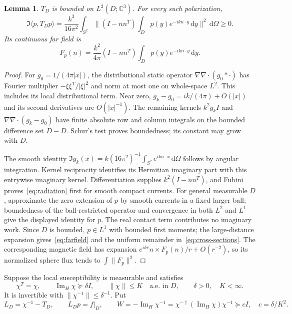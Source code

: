\documentclass[11pt,a4paper]{article}
\newtheorem{lemma}[theorem]{Lemma}
\theoremstyle{remark}
\newcommand{\norm}[1]{\lVert #1\rVert}
\newcommand{\abs}[1]{\lvert #1\rvert}
\newcommand{\ip}[2]{\langle #1,#2\rangle}
\newcommand{\dd}{\,\mathrm d}
\newcommand{\ImH}{\operatorname{Im}_{H}}
\begin{document}
\begin{lemma}\label{lem:Green}
$T_D$ is bounded on $L^2(D;\mathbb C^3)$. For every such polarization,
\begin{equation}\label{eq:radiation}
 \Im\ip p{T_Dp}=\frac{k^3}{16\pi^2}\int_{S^2}
 \norm{(I-nn^T)\int_Dp(y)e^{-ikn\cdot y}\dd y}^2\dd\Omega\geq0.
\end{equation}
Its continuous far field is
\begin{equation}\label{eq:farfield}
 F_p(n)=\frac{k^2}{4\pi}(I-nn^T)\int_Dp(y)e^{-ikn\cdot y}\dd y.
\end{equation}
\end{lemma}
\begin{proof}
For $g_0=1/(4\pi\abs x)$, the distributional static operator $\nabla\nabla\cdot(g_0*\cdot)$ has Fourier multiplier $-\xi\xi^T/\abs\xi^2$ and norm at most one on whole-space $L^2$. This includes its local distributional term. Near zero, $g_k-g_0=ik/(4\pi)+O(\abs x)$ and its second derivatives are $O(\abs x^{-1})$. The remaining kernels $k^2g_kI$ and $\nabla\nabla\cdot(g_k-g_0)$ have finite absolute row and column integrals on the bounded difference set $D-D$. Schur's test proves boundedness; its constant may grow with $D$.

The smooth identity $\Im g_k(x)=k(16\pi^2)^{-1}\int_{S^2}e^{ikn\cdot x}\dd\Omega$ follows by angular integration. Kernel reciprocity identifies its Hermitian imaginary part with this entrywise imaginary kernel. Differentiation supplies $k^2(I-nn^T)$, and Fubini proves~\eqref{eq:radiation} first for smooth compact currents. For general measurable $D$, approximate the zero extension of $p$ by smooth currents in a fixed larger ball; boundedness of the ball-restricted operator and convergence in both $L^2$ and $L^1$ give the displayed identity for $p$. The real contact term contributes no imaginary work. Since $D$ is bounded, $p\in L^1$ with bounded first moments; the large-distance expansion gives~\eqref{eq:farfield} and the uniform remainder in~\eqref{eq:cross-sections}. The corresponding magnetic field has expansion $e^{ikr}n\times F_p(n)/r+O(r^{-2})$, so its normalized sphere flux tends to $\int\norm{F_p}^2$.
\end{proof}

Suppose the local susceptibility is measurable and satisfies
\begin{equation}\label{eq:coercive-material}
 \chi^T=\chi,\qquad \ImH\chi\succeq\delta I,\qquad
 \norm\chi\leq K\quad\text{a.e. in }D,\qquad \delta>0,\quad K<\infty.
\end{equation}
It is invertible with $\norm{\chi^{-1}}\leq\delta^{-1}$. Put
\begin{equation}\label{eq:volume-equation}
 L_D=\chi^{-1}-T_D,\qquad L_Dp=f|_D,\qquad
 W=-\ImH\chi^{-1}=\chi^{-\dagger}(\ImH\chi)\chi^{-1}\succeq cI,
 \quad c=\delta/K^2.
\end{equation}
\end{document}
